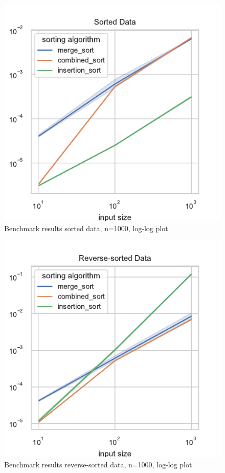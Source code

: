 \documentclass[sigconf, nonacm, natbib, screen, balance=False]{acmart}
\begin{document}
\vspace


\begin{figure}
  \centering
  \includegraphics[width=0.8\columnwidth]{sorted_plot1000.pdf}
  \caption{Benchmark results sorted data, n=1000, log-log plot}
  \label{fig:bench}
\end{figure}



\vspace



\begin{figure}
  \centering
  \includegraphics[width=0.8\columnwidth]{reversed_plot1000.pdf}
  \caption{Benchmark results reverse-sorted data, n=1000, log-log plot}
  \label{fig:bench}
\end{figure}
\end{document}
